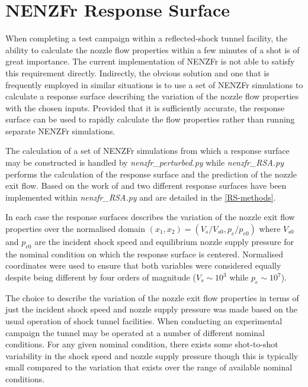 
\newpage
\section{NENZFr Response Surface}
\label{chapter-response-surface}

When completing a test campaign within a reflected-shock tunnel facility, the ability to calculate the nozzle flow properties within a few minutes of a shot is of great importance. The current implementation of NENZFr is not able to satisfy this requirement directly. Indirectly, the obvious solution and one that is frequently employed in similar situations is to use a set of NENZFr simulations to calculate a response surface describing the variation of the nozzle flow properties with the chosen inputs. Provided that it is sufficiently accurate, the response surface can be used to rapidly calculate the flow properties rather than running separate NENZFr simulations. 

The calculation of a set of NENZFr simulations from which a response surface may be constructed is handled by \textit{nenzfr\_perturbed.py} while \textit{nenzfr\_RSA.py} performs the calculation of the response surface and the prediction of the nozzle exit flow. Based on the work of \cite{Simpson_2001} and \cite{Giunta_2003} two different response surfaces have been implemented within \textit{nenzfr\_RSA.py} and are detailed in the \cref{RS-methods}. 

In each case the response surfaces describes the variation of the nozzle exit flow properties over the normalised domain $(x_1, x_2) = (V_s/V_{s0}, p_e/p_{e0})$ where $V_{s0}$ and $p_{e0}$ are the incident shock speed and equilibrium nozzle supply pressure for the nominal condition on which the response surface is centered. Normalised coordinates were used to ensure that both variables were considered equally despite being different by four orders of magnitude ($V_s\sim10^3$ while $p_e\sim10^7$).  

The choice to describe the variation of the nozzle exit flow properties in terms of just the incident shock speed and nozzle supply pressure was made based on the usual operation of shock tunnel facilities. When conducting an experimental campaign the tunnel may be operated at a number of different nominal conditions.  For any given nominal condition, there exists some shot-to-shot variability in the shock speed and nozzle supply pressure though this is typically small compared to the variation that exists over the range of available nominal conditions. 

